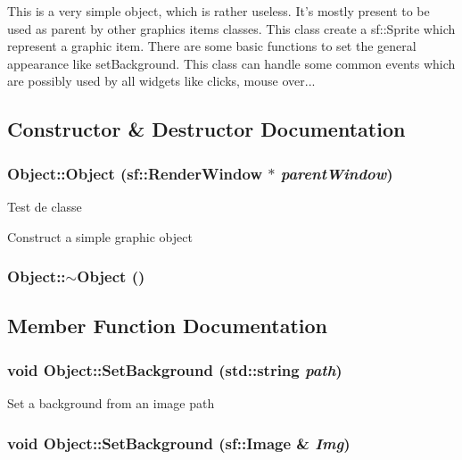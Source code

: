This is a very simple object, which is rather useless. It's mostly present to be used as parent by other graphics items classes. This class create a sf::Sprite which represent a graphic item. There are some basic functions to set the general appearance like setBackground. This class can handle some common events which are possibly used by all widgets like clicks, mouse over... 

\subsection{Constructor \& Destructor Documentation}
\hypertarget{classObject_cefe027e1cec4c9de78b851bb42e2e66}{
\subsubsection[Object]{\setlength{\rightskip}{0pt plus 5cm}Object::Object (sf::RenderWindow $\ast$ {\em parentWindow})}}
\label{classObject_cefe027e1cec4c9de78b851bb42e2e66}


Test de classe 

Construct a simple graphic object \hypertarget{classObject_e8f5483f459e46687bd01e6f9977afd3}{
\subsubsection[$\sim$Object]{\setlength{\rightskip}{0pt plus 5cm}Object::$\sim$Object ()}}
\label{classObject_e8f5483f459e46687bd01e6f9977afd3}




\subsection{Member Function Documentation}
\hypertarget{classObject_8e374c70b7dbaa03b2a3180490789d1d}{
\subsubsection[SetBackground]{\setlength{\rightskip}{0pt plus 5cm}void Object::SetBackground (std::string {\em path})}}
\label{classObject_8e374c70b7dbaa03b2a3180490789d1d}




Set a background from an image path \hypertarget{classObject_00d4be2d8b013240b29e50ca7599fe55}{
\subsubsection[SetBackground]{\setlength{\rightskip}{0pt plus 5cm}void Object::SetBackground (sf::Image \& {\em Img})}}
\label{classObject_00d4be2d8b013240b29e50ca7599fe55}




